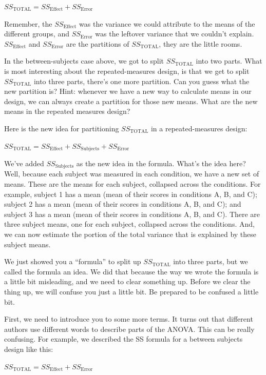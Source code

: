 \documentclass[
]{book}
\begin{document}
\(SS_\text{TOTAL} = SS_\text{Effect} + SS_\text{Error}\)

Remember, the \(SS_\text{Effect}\) was the variance we could attribute to the means of the different groups, and \(SS_\text{Error}\) was the leftover variance that we couldn't explain. \(SS_\text{Effect}\) and \(SS_\text{Error}\) are the partitions of \(SS_\text{TOTAL}\), they are the little rooms.

In the between-subjects case above, we got to split \(SS_\text{TOTAL}\) into two parts. What is most interesting about the repeated-measures design, is that we get to split \(SS_\text{TOTAL}\) into three parts, there's one more partition. Can you guess what the new partition is? Hint: whenever we have a new way to calculate means in our design, we can always create a partition for those new means. What are the new means in the repeated measures design?

Here is the new idea for partitioning \(SS_\text{TOTAL}\) in a repeated-measures design:

\(SS_\text{TOTAL} = SS_\text{Effect} + SS_\text{Subjects} +SS_\text{Error}\)

We've added \(SS_\text{Subjects}\) as the new idea in the formula. What's the idea here? Well, because each subject was measured in each condition, we have a new set of means. These are the means for each subject, collapsed across the conditions. For example, subject 1 has a mean (mean of their scores in conditions A, B, and C); subject 2 has a mean (mean of their scores in conditions A, B, and C); and subject 3 has a mean (mean of their scores in conditions A, B, and C). There are three subject means, one for each subject, collapsed across the conditions. And, we can now estimate the portion of the total variance that is explained by these subject means.

We just showed you a ``formula'' to split up \(SS_\text{TOTAL}\) into three parts, but we called the formula an idea. We did that because the way we wrote the formula is a little bit misleading, and we need to clear something up. Before we clear the thing up, we will confuse you just a little bit. Be prepared to be confused a little bit.

First, we need to introduce you to some more terms. It turns out that different authors use different words to describe parts of the ANOVA. This can be really confusing. For example, we described the SS formula for a between subjects design like this:

\(SS_\text{TOTAL} = SS_\text{Effect} + SS_\text{Error}\)
\end{document}
